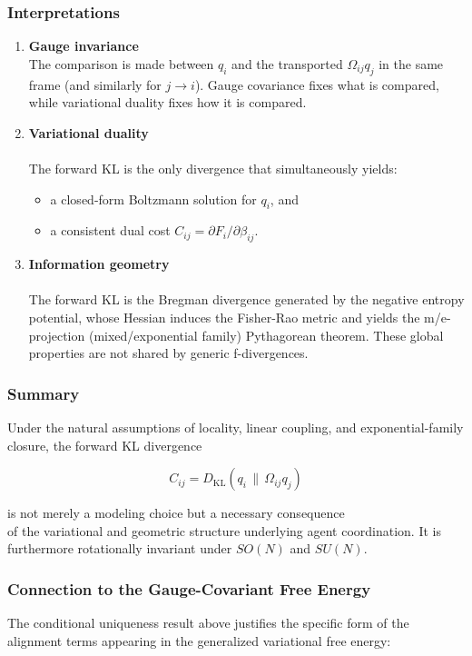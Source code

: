 \documentclass[11pt]{article}
\begin{document}
\subsubsection{Interpretations}
\begin{enumerate}
  \item \textbf{Gauge invariance}\\
The comparison is made between $q_i$ and the transported $\Omega_{ij}q_j$ in the same frame (and similarly for $j \rightarrow i$). Gauge covariance fixes what is compared, while variational duality fixes how it is compared.
  \item \textbf{Variational duality}\\
\\
The forward KL is the only divergence that simultaneously yields:
  \begin{itemize}
    \item a closed-form Boltzmann solution for $q_i$, and
    \item a consistent dual cost $C_{ij} = \partial F_i / 
\partial \beta_{ij}$.
  \end{itemize}
  \item \textbf{Information geometry}\\
\\
The forward KL is the Bregman divergence generated by the negative entropy potential, whose Hessian induces the Fisher-Rao metric and yields the m/e-projection (mixed/exponential family) Pythagorean theorem. These global properties are not shared by generic f-divergences.
\end{enumerate}

\subsubsection{Summary}
Under the natural assumptions of locality, linear coupling, and exponential-family closure, the forward KL divergence

\[
\boxed{
C_{ij}=D_{\mathrm{KL}}(q_i \,\|\, \Omega_{ij} q_j)}
\]

is not merely a modeling choice but a necessary consequence\\
of the variational and geometric structure underlying agent coordination.  It is furthermore rotationally invariant under $SO(N)$ and $SU(N)$.

\subsubsection{Connection to the Gauge-Covariant Free Energy}
The conditional uniqueness result above justifies the specific form of the alignment terms appearing in the generalized variational free energy:
\end{document}

